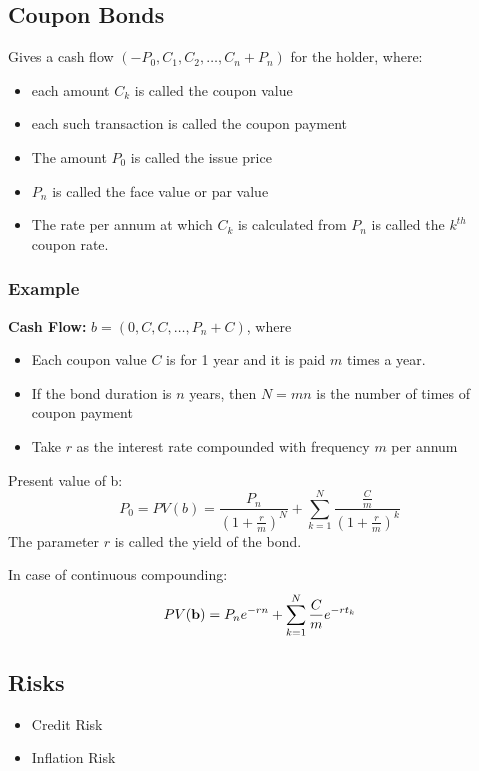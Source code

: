\documentclass{report}
\begin{document}
\subsection{Coupon Bonds}
Gives a cash flow $(-P_0, C_1, C_2, \dots, C_n+P_n)$ for the holder, where:
\begin{itemize}
    \item each amount $C_k$ is called the coupon value
    \item each such transaction is called the coupon payment
    \item The amount $P_0$ is called the issue price
    \item $P_n$ is called the face value or par value
    \item The rate per annum at which $C_k$ is calculated from $P_n$ is called the $k^{th}$ coupon rate.
\end{itemize}

\subsubsection{Example}
\textbf{Cash Flow:} $b = (0, C, C, \dots, P_n+C)$, where
\begin{itemize}
    \item Each coupon value $C$ is for 1 year and it is paid $m$ times a year.
    \item If the bond duration is $n$ years, then $N=mn$ is the number of times of coupon payment
    \item Take $r$ as the interest rate compounded with frequency $m$ per annum
\end{itemize}

Present value of b:
\begin{equation}
    P_0 = PV(b) = \frac{P_n}{(1+\frac{r}{m})^N} + \sum_{k=1}^N\frac{\frac{C}{m}}{(1+\frac{r}{m})^k}
\end{equation}
The parameter $r$ is called the yield of the bond.


In case of continuous compounding:
\begin{equation}
    PV({\bf b}) = P_ne^{-rn} + \sum_{k=1}^N\frac{C}{m}e^{-rt_k}
\end{equation}


\subsection{Risks}
\begin{itemize}
    \item Credit Risk
    \item Inflation Risk
\end{itemize}
\end{document}
